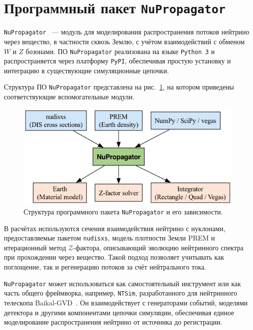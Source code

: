 \section{Программный пакет \texttt{NuPropagator}}

\texttt{NuPropagator}~\cite{nupropagator2022} — модуль для моделирования распространения потоков нейтрино через вещество, в частности сквозь Землю, с учётом взаимодействий с обменом $W$ и $Z$ бозонами. 
ПО \texttt{NuPropagator} реализована на языке \texttt{Python~3} и распространяется через платформу \texttt{PyPI}, обеспечивая простую установку и интеграцию в существующие симуляционные цепочки.

Структура ПО \texttt{NuPropagator} представлена на рис.~\ref{fig:nupropagator1}, на котором приведены соответствующие вспомогательные модули.
\begin{figure}[!h]
\centering
\includegraphics[width=\linewidth]{images/nupropagator_diagram.png}
\caption{Структура программного пакета \texttt{NuPropagator} и его зависимости.}
\label{fig:nupropagator1}
\end{figure}

В расчётах используются сечения взаимодействия нейтрино с нуклонами, предоставляемые пакетом \texttt{nudisxs}, модель плотности Земли PREM и итерационный метод $\mathcal{Z}$-фактора, описывающий эволюцию нейтринного спектра при прохождении через вещество. 
Такой подход позволяет учитывать как поглощение, так и регенерацию потоков за счёт нейтрального тока.

\texttt{NuPropagator} может использоваться как самостоятельный инструмент или как часть общего фреймворка, например, \texttt{NTSim}, разработанного для нейтринного телескопа Baikal-GVD~\cite{ntsim2025}. 
Он взаимодействует с генераторами событий, моделями детектора и другими компонентами цепочки симуляции, обеспечивая единое моделирование распространения нейтрино от источника до регистрации.
